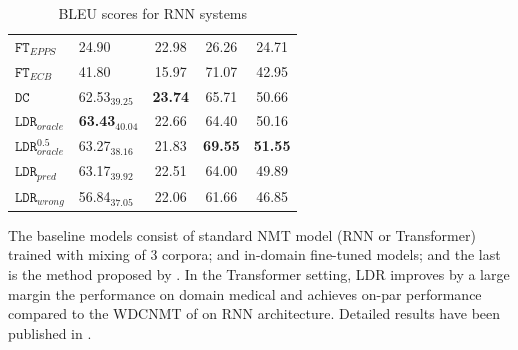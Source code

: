 \documentclass[12pt,a4paper,twoside]{report}
\theoremstyle{definition}
\begin{document}
\begin{table}[h!]
{\begin{center}
{\begin{tabular}{|l|lcc|c|}
$\mathtt{FT}_{EPPS}$   & 24.90$ $ & 22.98 & 26.26 & 24.71\\
$\mathtt{FT}_{ECB}$     & 41.80$ $ & 15.97 & 71.07 & 42.95\\
\hline
$\mathtt{DC}$                & 62.53$_{39.25}$ & \bf 23.74 & 65.71 & 50.66\\
\hline
$\mathtt{LDR}_{oracle}$     & \bf 63.43$_{40.04}$ & 22.66 & 64.40 & 50.16\\
$\mathtt{LDR}_{oracle}^{0.5}$   & 63.27$_{38.16}$ & 21.83 & \bf 69.55 & \bf 51.55\\
$\mathtt{LDR}_{pred}$        & 63.17$_{39.92}$ & 22.51 & 64.00 & 49.89\\
$\mathtt{LDR}_{wrong}$     & 56.84$_{37.05}$ & 22.06 & 61.66 & 46.85\\
\hline
\end{tabular}
} %
\end{center}
\caption{BLEU scores for RNN systems\label{tab:results-rnn}}
}
\end{table}
\begin{table}[!h]
\begin{center}
\end{center}
\caption{BLEU scores for RNN systems. Comparison between \texttt{WDCMT} and $\texttt{LDR}_{pred}$ built using conditional GRUs.\label{tab:results-rnn-wdcmt}}
\end{table}

The baseline models consist of standard NMT model (RNN or Transformer) trained with mixing of 3 corpora; and in-domain fine-tuned models; and the last is the method proposed by \cite{Zheng18multi}. In the Transformer setting, LDR improves by a large margin the performance on domain medical and achieves on-par performance compared to the WDCNMT of \cite{Zheng18multi} on RNN architecture. Detailed results have been published in \cite{Pham19generic}.
\end{document}
